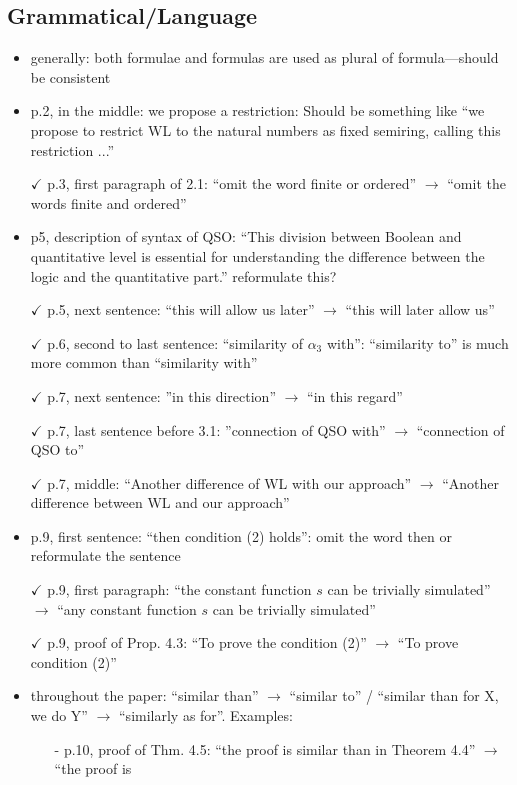 \documentclass[a4paper]{article}
\begin{document}
\subsection*{Grammatical/Language}
\begin{itemize}
	\setlength\itemsep{0.5em}
	\item generally: both formulae and formulas are used as plural of formula---should be consistent
	\item p.2, in the middle: we propose a restriction: Should be something like ``we propose to restrict
	WL to the natural numbers as fixed semiring, calling this restriction ...''
	\item[$\checkmark$] p.3, first paragraph of 2.1: ``omit the word finite or ordered'' $\to$ ``omit the words finite and
	ordered''
	\item p5, description of syntax of QSO: ``This division between Boolean and quantitative level
	is essential for understanding the difference between the logic and the quantitative part.''
	reformulate this?
	\item[$\checkmark$] p.5, next sentence: ``this will allow us later'' $\to$ ``this will later allow us''
	\item[$\checkmark$] p.6, second to last sentence: ``similarity of $\alpha_3$ with'': ``similarity to'' is much more common
	than ``similarity with''
	\item[$\checkmark$] p.7, next sentence: ''in this direction'' $\to$ ``in this regard''
	\item[$\checkmark$] p.7, last sentence before 3.1: ''connection of QSO with'' $\to$ ``connection of QSO to''
	\item[$\checkmark$] p.7, middle: ``Another difference of WL with our approach'' $\to$ ``Another difference between
	WL and our approach''
	\item p.9, first sentence: ``then condition (2) holds'': omit the word then or reformulate the sentence
	\item[$\checkmark$] p.9, first paragraph: ``the constant function $s$ can be trivially simulated'' $\to$ ``any constant
	function $s$ can be trivially simulated''
	\item[$\checkmark$] p.9, proof of Prop. 4.3: ``To prove the condition (2)'' $\to$ ``To prove condition (2)''
	\item throughout the paper: ``similar than'' $\to$ ``similar to'' / ``similar than for X, we do Y'' $\to$
	``similarly as for''. Examples:
	\begin{itemize}
		\item[-] p.10, proof of Thm. 4.5: ``the proof is similar than in Theorem 4.4'' $\to$ ``the proof is

\end{itemize}
\end{itemize}
\end{document}
